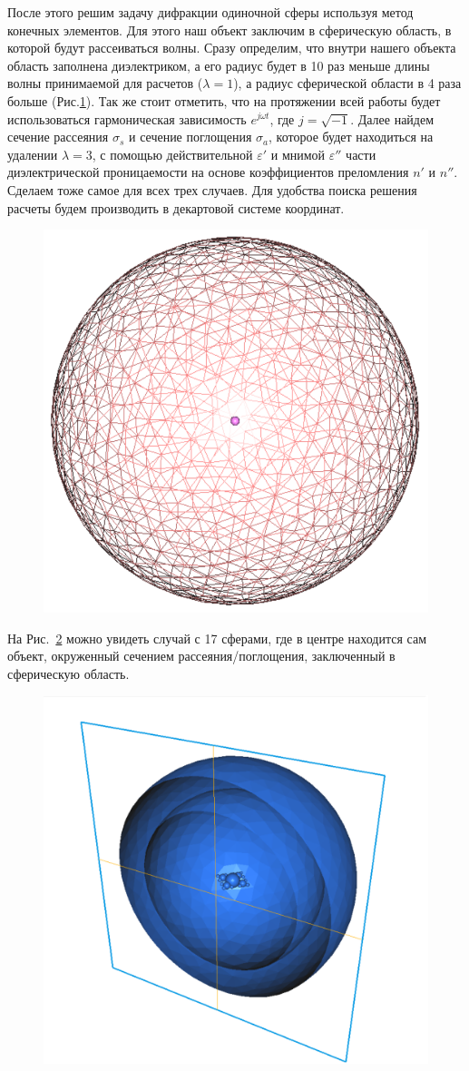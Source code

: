 \begin{flushleft}
	
После этого решим задачу дифракции одиночной сферы используя метод конечных элементов. Для этого наш объект заключим в сферическую область, в которой будут рассеиваться волны. Сразу определим, что внутри нашего объекта область заполнена диэлектриком, а его радиус будет в 10 раз меньше длины волны принимаемой для расчетов ($ \lambda = 1 $), а радиус сферической области в 4 раза больше (Рис.\ref{fig:ces1}). Так же стоит отметить, что на протяжении всей работы будет использоваться гармоническая зависимость $ e^{j \omega t} $, где $ j = \sqrt{-1} $. Далее найдем сечение рассеяния $ \sigma_s $ и сечение поглощения $ \sigma_a $, которое будет находиться на удалении $ \lambda = 3 $, с помощью действительной $ \varepsilon' $ и мнимой $ \varepsilon'' $ части диэлектрической проницаемости на основе коэффициентов преломления $ n' $ и $ n'' $. Сделаем тоже самое для всех трех случаев.  Для удобства поиска решения расчеты будем производить в декартовой системе координат. \\
\end{flushleft}

\begin{figure}[h!]
	\centering
	\includegraphics[width=0.5\linewidth]{ces1}
	\caption{}
	\label{fig:ces1}
\end{figure}
На Рис.~\ref{fig:q5} можно увидеть случай с 17 сферами, где в центре находится сам объект, окруженный сечением рассеяния/поглощения, заключенный в сферическую область.\\
\begin{figure}[h!]
	\centering
	\includegraphics[width=0.6\linewidth]{3td_scattererAndOuterSpheres}
	\caption{}
	\label{fig:q5}
\end{figure}

